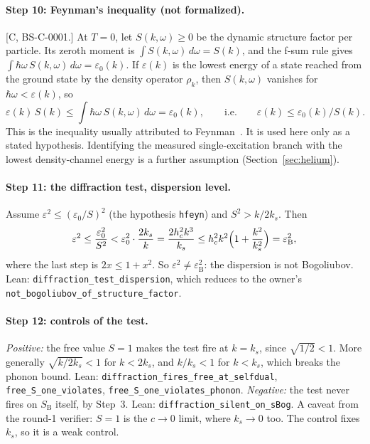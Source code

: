 \documentclass[11pt]{article}
\theoremstyle{remark}
\newcommand{\tier}[1]{\textsf{[#1]}}
\newcommand{\lean}[1]{\texttt{#1}}
\newcommand{\ks}{k_s}
\newcommand{\SB}{S_{\mathrm B}}
\newcommand{\eB}{\varepsilon_{\mathrm B}}
\begin{document}
\paragraph{Step 10: Feynman's inequality (not formalized).} \tier{C, BS-C-0001.} At $T=0$, let $S(k,\omega)\ge0$ be the
dynamic structure factor per particle. Its zeroth moment is $\int S(k,\omega)\,d\omega=S(k)$, and the f-sum rule gives
$\int\hbar\omega\,S(k,\omega)\,d\omega=\varepsilon_0(k)$. If $\varepsilon(k)$ is the lowest energy of a state reached
from the ground state by the density operator $\rho_k$, then $S(k,\omega)$ vanishes for $\hbar\omega<\varepsilon(k)$, so
\[
\varepsilon(k)\,S(k)\le\int\hbar\omega\,S(k,\omega)\,d\omega=\varepsilon_0(k),\qquad\text{i.e.}\qquad
\varepsilon(k)\le\varepsilon_0(k)/S(k).
\]
This is the inequality usually attributed to Feynman~\cite{feynman}. It is used here only as a stated hypothesis.
Identifying the measured single-excitation branch with the lowest density-channel energy is a further assumption
(Section~\ref{sec:helium}).

\paragraph{Step 11: the diffraction test, dispersion level.} Assume $\varepsilon^2\le(\varepsilon_0/S)^2$
(the hypothesis \lean{hfeyn}) and $S^2>k/2\ks$. Then
\[
\varepsilon^2\le\frac{\varepsilon_0^2}{S^2}<\varepsilon_0^2\cdot\frac{2\ks}{k}=\frac{2h_c^2k^3}{\ks}
\le h_c^2k^2\Bigl(1+\frac{k^2}{\ks^2}\Bigr)=\eB^2 ,
\]
where the last step is $2x\le1+x^2$. So $\varepsilon^2\ne\eB^2$: the dispersion is not Bogoliubov.
Lean: \lean{diffraction\_test\_dispersion}, which reduces to the owner's \lean{not\_bogoliubov\_of\_structure\_factor}.

\paragraph{Step 12: controls of the test.} \emph{Positive:} the free value $S=1$ makes the test fire at $k=\ks$,
since $\sqrt{1/2}<1$. More generally $\sqrt{k/2\ks}<1$ for $k<2\ks$, and $k/\ks<1$ for $k<\ks$, which breaks the
phonon bound. Lean: \lean{diffraction\_fires\_free\_at\_selfdual}, \lean{free\_S\_one\_violates},
\lean{free\_S\_one\_violates\_phonon}. \emph{Negative:} the test never fires on $\SB$ itself, by Step~3. Lean:
\lean{diffraction\_silent\_on\_sBog}. A caveat from the round-1 verifier: $S=1$ is the $c\to0$ limit, where $\ks\to0$
too. The control fixes $\ks$, so it is a weak control.
\end{document}
